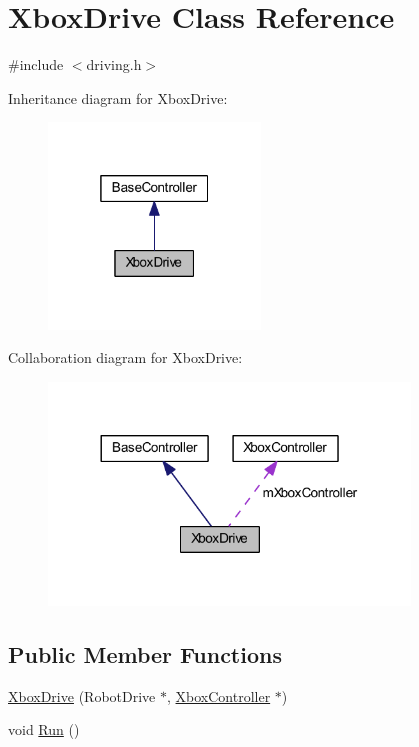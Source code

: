 \hypertarget{class_xbox_drive}{\section{\-Xbox\-Drive \-Class \-Reference}
\label{class_xbox_drive}
}


{\ttfamily \#include $<$driving.\-h$>$}



\-Inheritance diagram for \-Xbox\-Drive\-:\nopagebreak
\begin{figure}[H]
\begin{center}
\leavevmode
\includegraphics[width=160pt]{class_xbox_drive__inherit__graph}
\end{center}
\end{figure}


\-Collaboration diagram for \-Xbox\-Drive\-:\nopagebreak
\begin{figure}[H]
\begin{center}
\leavevmode
\includegraphics[width=272pt]{class_xbox_drive__coll__graph}
\end{center}
\end{figure}
\subsection*{\-Public \-Member \-Functions}
\begin{DoxyCompactItemize}
\item 
\hyperlink{class_xbox_drive_a3e04176a0b3dd5b1a70c76caa1b731c4}{\-Xbox\-Drive} (\-Robot\-Drive $\ast$, \hyperlink{class_xbox_controller}{\-Xbox\-Controller} $\ast$)
\item 
void \hyperlink{class_xbox_drive_a076db41b38356179e1263a52b110febb}{\-Run} ()
\end{DoxyCompactItemize}
